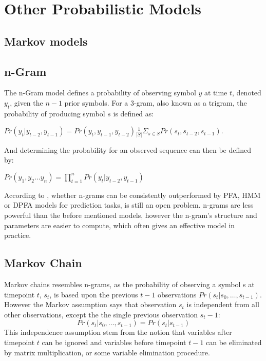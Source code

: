 \section{Other Probabilistic Models}
\subsection{Markov models}

\subsection{n-Gram}
The n-Gram model defines a probability of observing symbol $y$ at time $t$, denoted $y_t$, given the $n-1$ prior symbols. For a 3-gram, also known as a trigram, the probability of producing symbol $s$ is defined as:
\begin{description}
\item $Pr(y_t | y_{t-2}, y_{t-1}) = Pr(y_t, y_{t-1}, y_{t-2}) \frac{1}{|S|}\Sigma_{s \in S} Pr(s_t, s_{t-2}, s_{t-1})$. 
\end{description}
And determining the probability for an observed sequence can then be defined by:
\begin{description}
\item $Pr(y_1, y_2 \dots y_n) = \prod_{t = 1}^{n} Pr(y_t | y_{t-2}, y_{t-1})$ \cite{Notesw4705}
\end{description}
According to \cite{PautomaCTR}, whether n-grams can be consistently outperformed by PFA, HMM or DPFA models for prediction tasks, is still an open problem. n-grams are less powerful than the before mentioned models, however the n-gram’s structure and parameters are easier to compute, which often gives an effective model in practice.

\subsection{Markov Chain}
Markov chains resembles n-grams, as the probability of observing a symbol s at timepoint $t$, $s_t$, is based upon the previous $t-1$ observations $Pr(s_t | s_0, \dots ,s_{t-1})$. However the Markov assumption says that observation $s_t$ is independent from all other observations, except the the single previous observation $s_t-1$:
$$Pr(s_t | s_0, \dots ,s_{t-1}) = Pr(s_t | s_{t-1})$$
This independence assumption stem from the notion that variables after timepoint $t$ can be ignored and variables before timepoint $t-1$ can be eliminated by matrix multiplication, or some variable elimination procedure. \cite{poole2010artificial}


